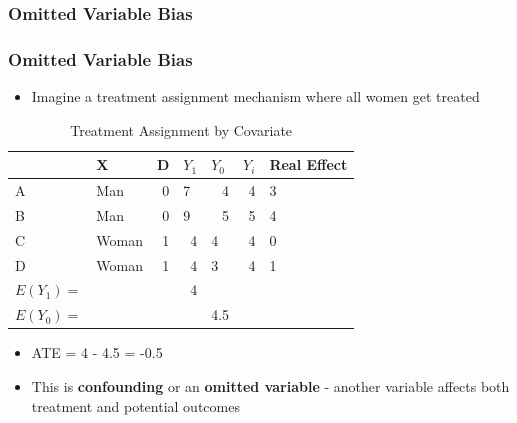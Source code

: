 \documentclass[xcolor=x11names,compress]{beamer}\usepackage[]{graphicx}\usepackage[]{color}
\makeatletter
\newenvironment{kframe}{%
 \def\at@end@of@kframe{}%
 \ifinner\ifhmode%
  \def\at@end@of@kframe{\end{minipage}}%
  \begin{minipage}{\columnwidth}%
 \fi\fi%
 \def\FrameCommand##1{\hskip\@totalleftmargin \hskip-\fboxsep
 \colorbox{shadecolor}{##1}\hskip-\fboxsep
     \hskip-\linewidth \hskip-\@totalleftmargin \hskip\columnwidth}%
 \MakeFramed {\advance\hsize-\width
   \@totalleftmargin\z@ \linewidth\hsize
   \@setminipage}}%
 {\par\unskip\endMakeFramed%
 \at@end@of@kframe}
\newenvironment{knitrout}{}{} %
\renewcommand{\(}{\begin{columns}}
\renewcommand{\)}{\end{columns}}
\newcommand{\<}[1]{\begin{column}{#1}}
\renewcommand{\>}{\end{column}}
\makeatother
\begin{document}
\begin{frame}
\frametitle{Omitted Variable Bias}
\begin{knitrout}
\color{fgcolor}\begin{kframe}


{\ttfamily\noindent\bfseries{}}

{\ttfamily\noindent\bfseries{}}\end{kframe}
\end{knitrout}
\end{frame}


\begin{frame}
\frametitle{Omitted Variable Bias}
\begin{itemize}
\item Imagine a treatment assignment mechanism where all women get treated
\end{itemize}
\begin{table}[htbp]
  \centering
  \caption{Treatment Assignment by Covariate}
    \begin{tabular}{|l|l|r|r|l|r|l|}
    \hline
          & X     & \multicolumn{1}{l|}{D} & \multicolumn{1}{l|}{$Y_1$} & $Y_0$  & \multicolumn{1}{l|}{$Y_i$} & Real Effect \bigstrut\\
    \hline
    A     & Man   & 0     & \multicolumn{1}{l|}{7} & \multicolumn{1}{r|}{\cellcolor{teal}4} & 4     & 3 \bigstrut\\
    \hline
    B     & Man   & 0     & \multicolumn{1}{l|}{9} & \multicolumn{1}{r|}{\cellcolor{teal}5} & 5     & 4 \bigstrut\\
    \hline
    C     & Woman & 1     & \cellcolor{teal}4     & 4     & 4     & 0 \bigstrut\\
    \hline
    D     & Woman & 1     & \cellcolor{teal}4     & 3     & 4     & 1 \bigstrut\\
    \hline\pause
    $E(Y_1)=$ & & & 4 & & \bigstrut\\
    \hline
    $E(Y_0)=$ & &  & & 4.5 & \bigstrut\\
    \hline
    \end{tabular}%
  \label{tab:addlabel}%
\end{table}%
\begin{itemize}
\pause
\item ATE = 4 - 4.5 = -0.5
\item This is \textbf{confounding} or an \textbf{omitted variable} - another variable affects both treatment and potential outcomes
\end{itemize}
\end{frame}
\end{document}
